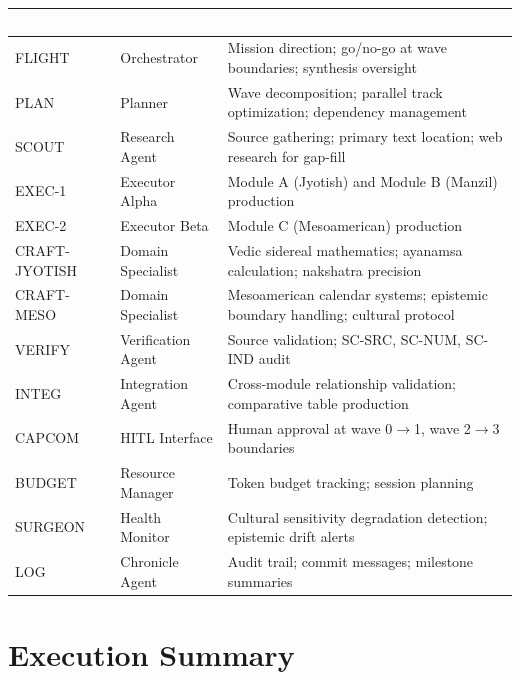 \documentclass[11pt,letterpaper]{article}
\newcommand{\tableheader}[1]{\textbf{\sffamily\textcolor{white}{#1}}}
\begin{document}
\begin{center}
\begin{tabularx}{\textwidth}{L{2cm}L{2.5cm}X}
\toprule
{}
\tableheader{Role} & \tableheader{Agent} & \tableheader{Responsibility} \\
\midrule
FLIGHT & Orchestrator & Mission direction; go/no-go at wave boundaries; synthesis oversight \\
PLAN & Planner & Wave decomposition; parallel track optimization; dependency management \\
SCOUT & Research Agent & Source gathering; primary text location; web research for gap-fill \\
EXEC-1 & Executor Alpha & Module A (Jyotish) and Module B (Manzil) production \\
EXEC-2 & Executor Beta & Module C (Mesoamerican) production \\
CRAFT-JYOTISH & Domain Specialist & Vedic sidereal mathematics; ayanamsa calculation; nakshatra precision \\
CRAFT-MESO & Domain Specialist & Mesoamerican calendar systems; epistemic boundary handling; cultural protocol \\
VERIFY & Verification Agent & Source validation; SC-SRC, SC-NUM, SC-IND audit \\
INTEG & Integration Agent & Cross-module relationship validation; comparative table production \\
CAPCOM & HITL Interface & Human approval at wave 0$\to$1, wave 2$\to$3 boundaries \\
BUDGET & Resource Manager & Token budget tracking; session planning \\
SURGEON & Health Monitor & Cultural sensitivity degradation detection; epistemic drift alerts \\
LOG & Chronicle Agent & Audit trail; commit messages; milestone summaries \\
\bottomrule
\end{tabularx}
\end{center}

\section{Execution Summary}
\end{document}
